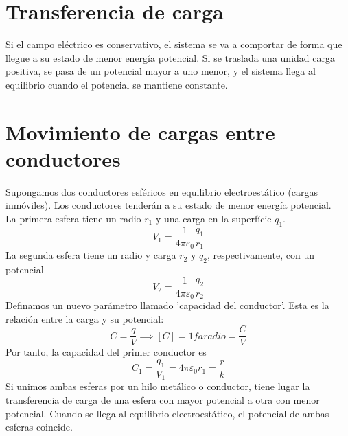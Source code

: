 \documentclass{./FisicaII.tex}
\begin{document}
\section{Transferencia de carga}
 Si el campo eléctrico es conservativo, el sistema se va a comportar de forma que llegue a su estado de menor energía potencial. Si se traslada una unidad carga positiva, se pasa de un potencial mayor a uno menor, y el sistema llega al equilibrio cuando el potencial se mantiene constante.
\section{Movimiento de cargas entre conductores}
Supongamos dos conductores esféricos en equilibrio electroestático (cargas inmóviles). Los conductores tenderán a su estado de menor energía potencial.\\
La primera esfera tiene un radio $r_1$ y una carga en la superfície $q_1$.
\[
	V_1 = \frac{1}{4\pi \varepsilon_0} \frac{q_1}{r_1}
\]
La segunda esfera tiene un radio y carga $r_2$ y $q_2$, respectivamente, con un potencial  
\[
	V_2 = \frac{1}{4\pi \varepsilon_0} \frac{q_2}{r_2}
\]
Definamos un nuevo parámetro llamado 'capacidad del conductor'. Esta es la relación entre la carga y su potencial:
\[
	C = \frac{q}{V} \implies [C] = 1 faradio = \frac{C}{V}
\]
Por tanto, la capacidad del primer conductor es
\[
	C_1 = \frac{q_1}{V_1} = 4\pi \varepsilon_0 r_1 = \frac{r}{k}
\]
Si unimos ambas esferas por un hilo metálico o conductor, tiene lugar la transferencia de carga de una esfera con mayor potencial a otra con menor potencial. Cuando se llega al equilibrio electroestático, el potencial de ambas esferas coincide.
\begin{figure}[ht]
\centering




\end{figure}
\end{document}
